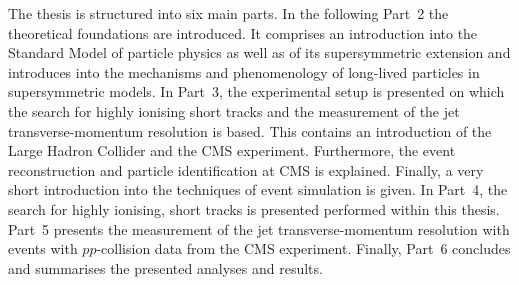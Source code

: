 The thesis is structured into six main parts.
In the following Part~2 the theoretical foundations are introduced.
It comprises an introduction into the Standard Model of particle physics as well as of its supersymmetric extension and introduces into the mechanisms and phenomenology of long-lived particles in supersymmetric models.
In Part~3, the experimental setup is  presented on which the search for highly ionising short tracks and the measurement of the jet transverse-momentum resolution is based.
This contains an introduction of the Large Hadron Collider and the CMS experiment.
Furthermore, the event reconstruction and particle identification at CMS is explained.
Finally, a very short introduction into the techniques of event simulation is given.
In Part~4, the search for highly ionising, short tracks is presented performed within this thesis.
Part~5 presents the measurement of the jet transverse-momentum resolution with \GAMJET events with $pp$-collision data from the CMS experiment.
Finally, Part~6 concludes and summarises the presented analyses and results.

